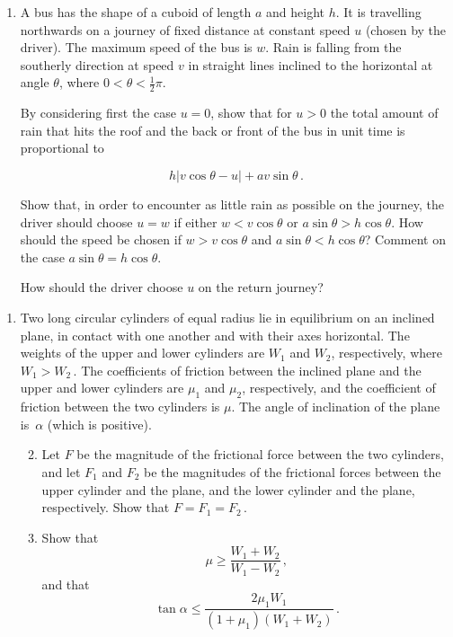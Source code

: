\documentclass[a4, 11pt]{report}
\newlength{\qspace}
\newcounter{qnumber}
\newenvironment{question}%
 {\vspace{\qspace}
  \begin{enumerate}[\bfseries 1\quad][10]%
    \setcounter{enumi}{\value{qnumber}}%
    \item%
 }
{
  \end{enumerate}
  \filbreak
  \stepcounter{qnumber}
 }
\newenvironment{questionparts}[1][1]%
 {
  \begin{enumerate}[\bfseries (i)]%
    \setcounter{enumii}{#1}
    \addtocounter{enumii}{-1}
    \setlength{\itemsep}{5mm}
    \setlength{\parskip}{8pt}
 }
 {
  \end{enumerate}
 }
\def\le{\leqslant}
\def\ge{\geqslant}
\renewcommand{\.}[1]{\ensuremath{\mathrm{#1}}}
\newcommand{\+}[1]{\ensuremath{\mathbf{#1}}}
\begin{document}
\begin{question}	
A bus has the shape of a cuboid of length $a$ and height $h$. It is travelling northwards on a journey of fixed distance at constant speed $u$ (chosen by the driver). The maximum speed of the bus is $w$. Rain is falling from the southerly direction at speed $v$ in straight lines inclined to the horizontal at angle $\theta$, where $0<\theta<\frac12\pi$.


By considering first the case $u=0$, show that for $u>0$ the total amount of  rain that hits the roof and the back or front of the bus in unit time is proportional to

\[
h\big \vert v\cos\theta - u \big\vert + av\sin\theta
\,.
\]

Show that, in order to encounter as little rain as possible on the journey, the driver should choose $ u=w$  if either  $w< v\cos\theta$ or $ a\sin\theta > h\cos\theta$. How should the speed be chosen if $w>v\cos\theta$ and $ a\sin\theta < h\cos\theta$? Comment on the case $ a\sin\theta = h\cos\theta$.

How should the driver choose $u$ on the return journey?

\end{question}


\begin{question}
Two long circular cylinders of equal radius lie in equilibrium on an inclined plane,  in \mbox{contact} with one another and with their axes horizontal. The weights of the upper and lower \mbox{cylinders} are  $W_1$ and $W_2$, respectively, where $W_1>W_2$\,. The coefficients of friction \mbox{between} the \mbox{inclined} plane and the upper and lower cylinders are $\mu_1$ and $\mu_2$, respectively, and the \mbox{coefficient} of friction \mbox{between} the two cylinders is $\mu$. The angle of inclination of the plane is~$\alpha$ (which is positive). 

\begin{questionparts}
\item Let $F$ be the magnitude of the frictional force between the two cylinders, and let $F_1$ and $F_2$ be the magnitudes of the frictional forces between the upper cylinder and the plane, and the lower cylinder and the plane, respectively. Show that $F=F_1=F_2\,$.

\item  Show that
\[
\mu \ge \dfrac{W_1+W_2}{W_1-W_2}
\,,\]
and that
\[
 \tan\alpha \le \frac{ 2 \mu_1 W_1}{(1+\mu_1)(W_1+ W_2)}\,.
\]
\end{questionparts}
\end{question}
	
\end{document}
